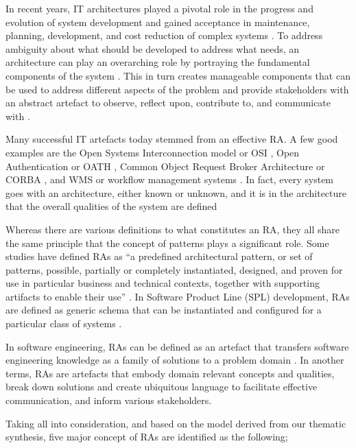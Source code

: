 \documentclass{ieeeaccess}
\begin{document}
In recent years, IT architectures played a pivotal role in the progress and evolution of system development and gained acceptance in maintenance, planning, development, and cost reduction of complex systems \cite{martinez2015solid}. To address ambiguity about what should be developed to address what needs, an architecture can play an overarching role by portraying the fundamental components of the system \cite{Sievi-Korte}. This in turn creates manageable components that can be used to address different aspects of the problem and provide stakeholders with an abstract artefact to observe, reflect upon, contribute to, and communicate with \cite{kohler2019towards}.

Many successful IT artefacts today stemmed from an effective RA. A few good examples are the Open Systems Interconnection model or OSI \cite{zimmermann1980osi}, Open Authentication or OATH \cite{OATH}, Common Object Request Broker Architecture or CORBA \cite{pope1998corba}, and WMS or workflow management systems \cite{greefhorst1999een}. In fact, every system goes with an architecture, either known or unknown, and it is in the architecture that the overall qualities of the system are defined

Whereas there are various definitions to what constitutes an RA, they all share the same principle that the concept of patterns plays a significant role. Some studies have defined RAs as “a predefined architectural pattern, or set of patterns, possible, partially or completely instantiated, designed, and proven for use in particular business and technical contexts, together with supporting artifacts to enable their use” \cite{Cloutier}. In Software Product Line (SPL) development, RAs are defined as generic schema that can be instantiated and configured for a particular class of systems \cite{Derras}.

In software engineering, RAs can be defined as an artefact that transfers software engineering knowledge as a family of solutions to a problem domain \cite{Klein}. In another terms, RAs are artefacts that embody domain relevant concepts and qualities, break down solutions and create ubiquitous language to facilitate effective communication, and inform various stakeholders. 

Taking all into consideration, and based on the model derived from our thematic synthesis, five major concept of RAs are identified as the following; 
\end{document}
